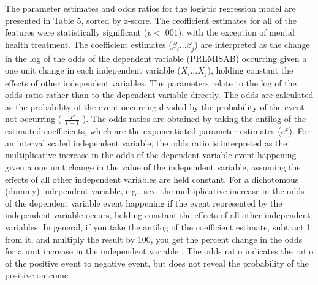 \documentclass[sigconf]{acmart}
\begin{document}
The parameter estimates and odds ratios for the logistic regression model are 
presented in Table 5, sorted by z-score. The ceofficient estimates for all of 
the features were statistically significant ($p<.001$), with the exception of 
mental health treatment. The coefficient estimates ($\beta_i$...$\beta_j$) 
are interpreted as the change in the log of the odds of the dependent variable 
(PRLMISAB) occurring given a one unit change in each independent variable
($X_i$...$X_j$), holding constant the effects of other independent variables. 
The parameters relate to the log of the odds ratio rather than to the dependent 
variable directly. The odds are calculated as the probability of the event 
occurring divided by the probability of the event not occurring 
( \(\frac{P}{P-1}\) ). The odds ratios are obtained by taking the antilog of 
the estimated coefficients, which are the exponentiated parameter estimates 
($e^x$). For an interval scaled independent variable, the odds ratio 
is interpreted as the multiplicative increase in the odds of the dependent 
variable event happening given a one unit change in the value of the 
independent variable, assuming the effects of all other independent variables 
are held constant. For a dichotomous (dummy) independent variable, e.g., sex, 
the multiplicative increase in the odds of the dependent variable event 
happening if the event represented by the independent variable occurs, holding 
constant the effects of all other independent variables. In general, if you 
take the antilog of the coefficient estimate, subtract 1 from it, and multiply 
the result by 100, you get the percent change in the odds for a unit increase 
in the independent variable  \cite{gujarati09}.  The odds ratio indicates the 
ratio of the positive event to negative event, but does not reveal the 
probability of the positive outcome.

\end{document}
